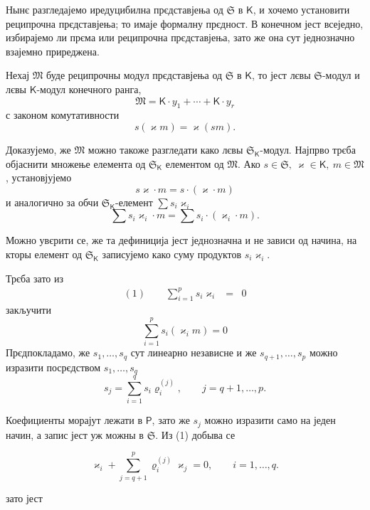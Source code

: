 \documentclass[11pt]{article}
\begin{document}
Нынє разгледајемо иредуцибилна прєдставјења од \(\mathfrak S\) в \(\mathsf K\), и хочемо установити реципрочна прєдставјења; то имаје формалну прєдност. В конечном јест всеједно, избирајемо ли прєма или реципрочна прєдставјења, зато же она сут једнозначно взајемно приреджена.

Нехај \(\mathfrak M\) буде реципрочны модул прєдставјења од \(\mathfrak S\) в \(\mathsf K\), то јест лєвы \(\mathfrak S\)-модул и лєвы \(\mathsf K\)-модул конечного ранга,
\[
\mathfrak M=\mathsf K\cdot y_1+\cdots+\mathsf K\cdot y_r
\]
с законом комутативности
\[
s(\varkappa m)=\varkappa (sm).
\]

Доказујемо, же \(\mathfrak M\) можно такоже разгледати како лєвы \(\mathfrak S_{\mathsf K}\)-модул. Најпрво трєба објаснити множење елемента од \(\mathfrak S_{\mathsf K}\) елементом од \(\mathfrak M\). Ако \(s\in\mathfrak S,\ \varkappa \in\mathsf K,\ m\in\mathfrak M\), установјујемо
\[
s\varkappa \cdot m=s\cdot(\varkappa \cdot m)
\]
и аналогично за обчи \(\mathfrak S_{\mathsf K}\)-елемент \(\sum s_i\varkappa _i\)
\[
\sum s_i\varkappa _i\cdot m=\sum s_i\cdot(\varkappa _i\cdot m).
\]

Можно увєрити се, же та дефиниција јест једнозначна и не зависи од начина, на кторы елемент од \(\mathfrak S_{\mathsf K}\) записујемо како суму продуктов \(s_i\varkappa _i\).

Трєба зато из
\[
\begin{array}{rcl}
(1)\qquad \displaystyle\sum_{i=1}^{p}s_i\varkappa _i&=&0
\end{array}
\]
закључити
\[
\sum_{i=1}^{p}s_i(\varkappa _i m)=0
\]
Прєдпокладамо, же \(s_1,\ldots,s_q\) сут линеарно независне и же \(s_{q+1},\ldots,s_p\) можно изразити посрєдством \(s_1,\ldots,s_q\)
\[
s_j=\sum_{i=1}^{q}s_i\varrho_i^{(j)},\qquad j=q+1,\ldots,p.
\]

Коефициенты морајут лежати в \(\mathsf P\), зато же \(s_j\) можно изразити само на једен начин, а запис јест уж можны в \(\mathfrak S\). Из (1) добыва се

\[
\varkappa _i+\sum_{j=q+1}^{p}\varrho_i^{(j)}\varkappa _j=0,\qquad i=1,\ldots,q.
\]

зато јест
\end{document}

